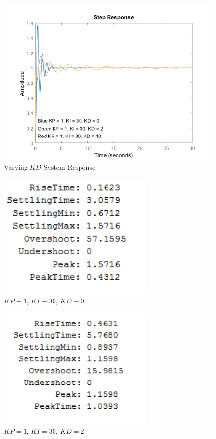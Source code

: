 \documentclass[12pt]{article}
\begin{document}
\begin{figure}[h!] %
   \centering
   \includegraphics[width=\linewidth]{part_3_response.png} 
   \caption{Varying $KD$ System Response}
   \label{fig:example}
\end{figure}

\bigskip

\begin{figure}[h!] %
   \centering
   \includegraphics[width=3in]{3_1300.png} 
   \caption{$KP = 1$, $KI = 30$, $KD = 0$}
   \label{fig:example}
\end{figure}

\newpage

\begin{figure}[h!] %
   \centering
   \includegraphics[width=3in]{3_1302.png} 
   \caption{$KP = 1$, $KI = 30$, $KD = 2$}
   \label{fig:example}
\end{figure}
\end{document}
